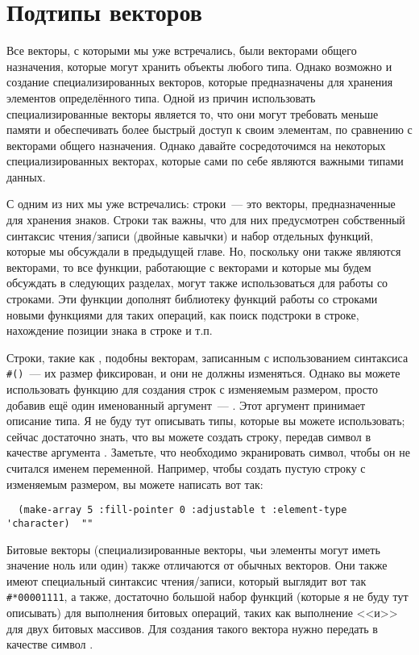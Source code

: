 \section{Подтипы векторов}

Все векторы, с которыми мы уже встречались, были векторами общего назначения, которые
могут хранить объекты любого типа.  Однако возможно и создание специализированных
векторов, которые предназначены для хранения элементов определённого типа.  Одной из
причин использовать специализированные векторы является то, что они могут требовать
меньше памяти и обеспечивать более быстрый доступ к своим элементам, по сравнению с
векторами общего назначения.  Однако давайте сосредоточимся на некоторых
специализированных векторах, которые сами по себе являются важными типами данных.

С одним из них мы уже встречались: строки~--- это векторы, предназначенные для хранения
знаков.  Строки так важны, что для них предусмотрен собственный синтаксис чтения/записи
(двойные кавычки) и набор отдельных функций, которые мы обсуждали в предыдущей главе.  Но,
поскольку они также являются векторами, то все функции, работающие с векторами и которые мы
будем обсуждать в следующих разделах, могут также использоваться для работы со строками.
Эти функции дополнят библиотеку функций работы со строками новыми функциями для таких
операций, как поиск подстроки в строке, нахождение позиции знака в строке и т.п.

Строки, такие как , подобны векторам, записанным с использованием синтаксиса
\lstinline!#()!~--- их размер фиксирован, и они не должны изменяться.  Однако вы можете
использовать функцию  для создания строк с изменяемым размером, просто
добавив ещё один именованный аргумент~--- .  Этот аргумент принимает
описание типа.  Я не буду тут описывать типы, которые вы можете использовать; сейчас
достаточно знать, что вы можете создать строку, передав символ  в
качестве аргумента .  Заметьте, что необходимо экранировать
символ, чтобы он не считался именем переменной.  Например, чтобы создать пустую строку с
изменяемым размером, вы можете написать вот так:

\begin{verbatim}
  (make-array 5 :fill-pointer 0 :adjustable t :element-type 'character)  ""
\end{verbatim}

Битовые векторы (специализированные векторы, чьи элементы могут иметь значение ноль или
один) также отличаются от обычных векторов.  Они также имеют специальный синтаксис
чтения/записи, который выглядит вот так \lstinline!#*00001111!, а также, достаточно большой
набор функций (которые я не буду тут описывать) для выполнения битовых операций, таких как
выполнение <<и>> для двух битовых массивов.  Для создания такого вектора нужно передать
в качестве  символ .

